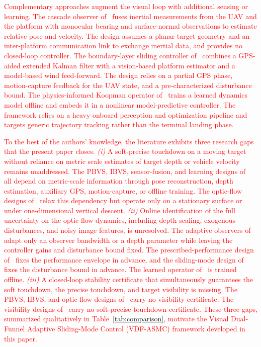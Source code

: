 \documentclass{IEEEtaes}
\newcommand{\new}[1]{\textcolor{red}{#1}}
\begin{document}
\new{Complementary approaches augment the visual loop with additional sensing or learning. The cascade observer of~\cite{bouazza2025} fuses inertial measurements from the UAV and the platform with monocular bearing and surface-normal observations to estimate relative pose and velocity. The design assumes a planar target geometry and an inter-platform communication link to exchange inertial data, and provides no closed-loop controller. The boundary-layer sliding controller of~\cite{paris2020} combines a GPS-aided extended Kalman filter with a vision-based platform estimator and a model-based wind feed-forward. The design relies on a partial GPS phase, motion-capture feedback for the UAV state, and a pre-characterized disturbance bound. The physics-informed Koopman operator of~\cite{kamath2026} trains a learned dynamics model offline and embeds it in a nonlinear model-predictive controller. The framework relies on a heavy onboard perception and optimization pipeline and targets generic trajectory tracking rather than the terminal landing phase.}

\new{To the best of the authors' knowledge, the literature exhibits three research gaps that the present paper closes. \emph{(i)} A soft-precise touchdown on a moving target without reliance on metric scale estimates of target depth or vehicle velocity remains unaddressed. The PBVS, IBVS, sensor-fusion, and learning designs of~\cite{lin2022, zhang2026, cho2022, chen2025, bouazza2025, paris2020, kamath2026} all depend on metric-scale information through pose reconstruction, depth estimation, auxiliary GPS, motion-capture, or offline training. The optic-flow designs of~\cite{herisse2012, izzo2011, singhal2025} relax this dependency but operate only on a stationary surface or under one-dimensional vertical descent. \emph{(ii)} Online identification of the full uncertainty on the optic-flow dynamics, including depth scaling, exogenous disturbances, and noisy image features, is unresolved. The adaptive observers of~\cite{zhang2026, chen2025} adapt only an observer bandwidth or a depth parameter while leaving the controller gains and disturbance bound fixed. The prescribed-performance design of~\cite{lin2022} fixes the performance envelope in advance, and the sliding-mode design of~\cite{paris2020} fixes the disturbance bound in advance. The learned operator of~\cite{kamath2026} is trained offline. \emph{(iii)} A closed-loop stability certificate that simultaneously guarantees the soft touchdown, the precise touchdown, and target visibility is missing. The PBVS, IBVS, and optic-flow designs of~\cite{lin2022, zhang2026, cho2022, chen2025, herisse2012, izzo2011, singhal2025} carry no visibility certificate. The visibility designs of~\cite{salehi2021, xie2016} carry no soft-precise touchdown certificate. These three gaps, summarized qualitatively in Table~\ref{tab:comparison}, motivate the Visual Dual-Funnel Adaptive Sliding-Mode Control (VDF-ASMC) framework developed in this paper.}
\end{document}
